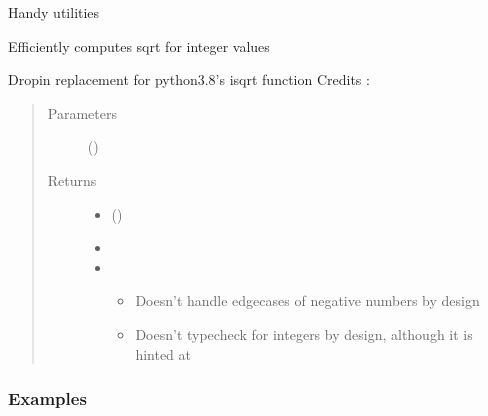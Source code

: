 \documentclass[letterpaper,10pt,english]{sphinxmanual}
\begin{document}
\label{\detokenize{documentation:module-elastica.utils}}
Handy utilities

\begin{fulllineitems}
\label{\detokenize{documentation:elastica.utils.isqrt}}
Efficiently computes sqrt for integer values

Dropin replacement for python3.8’s isqrt function
Credits : 
\begin{quote}\begin{description}
\item[{Parameters}] \leavevmode
{} (\sphinxstyleliteralemphasis{\sphinxupquote{, }}) \textendash{} 

\item[{Returns}] \leavevmode
\begin{itemize}
\item {} 
 ()

\item {} 

\item {} 
 \textendash{}
\begin{itemize}
\item {} 
Doesn’t handle edge\sphinxhyphen{}cases of negative numbers by design

\item {} 
Doesn’t type\sphinxhyphen{}check for integers by design, although it is hinted at

\end{itemize}

\end{itemize}


\end{description}\end{quote}
\subsubsection*{Examples}

\end{fulllineitems}
\end{document}

